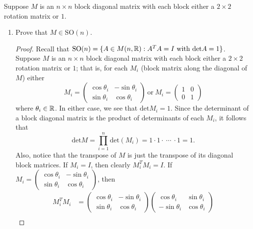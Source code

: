 \documentclass{article}
\begin{document}
\begin{problem}
    Suppose \( M  \) is an \( n \times n  \) block diagonal matrix with each block either a \( 2 \times 2  \) rotation matrix or \( 1  \).
\end{problem}
\begin{enumerate}
    \item[(11-1)]  Prove that \( M \in \text{SO}(n)   \).
    \begin{proof}
        Recall that \( \text{SO}(n) = \{ A \in M(n,\mathbb{R}) : A^{T} A = I \ \text{with} \ \text{det}A = 1  \}   \). Suppose \( M  \) is an \( n \times n  \) block diagonal matrix with each block either a \( 2 \times 2  \) rotation matrix or \( 1  \); that is, for each \( {M}_{i} \) (block matrix along the diagonal of \( M \)) either 
        \[ {M}_{i} = \begin{pmatrix} \cos {\theta}_{i} & - \sin {\theta}_{i} \\ \sin \theta_i & \cos \theta_i  \end{pmatrix} \ \text{or} \ {M}_{i} = \begin{pmatrix} 1 & 0 \\ 0 & 1  \end{pmatrix}  \tag{\( 1 \leq i \leq n \)} \]
        where \( {\theta}_{i} \in \mathbb{R}  \). In either case, we see that \( \text{det} {M}_{i} = 1  \). Since the determinant of a block diagonal matrix is the product of determinants of each \( {M}_{i} \), it follows that 
        \[  \text{det}M = \prod_{i=1}^{n} \text{det}({M}_{i})  = 1 \cdot 1 \cdot \ \cdots \ \cdot 1 = 1. \]
        Also, notice that the transpose of \( M  \) is just the transpose of its diagonal block matrices. If \( {M}_{i} = I  \), then clearly \({M}_{i}^{T} {M}_{i} = I \). If \( {M}_{i} = \displaystyle \begin{pmatrix} \cos {\theta}_{i} & - \sin \theta_i \\ \sin {\theta}_{i} & \cos {\theta}_{i} \end{pmatrix}  \), then
        \begin{align*}
            {M}_{i}^{T} {M}_{i} &= \begin{pmatrix} \cos {\theta}_{i} & - \sin {\theta}_{i} \\ \sin {\theta}_{i} & \cos {\theta}_{i} \end{pmatrix} \begin{pmatrix} \cos {\theta}_{i} & \sin {\theta}_{i} \\ - \sin \theta_i & \cos \theta_i \end{pmatrix}  \\

\end{align*}
\end{proof}
\end{enumerate}
\end{document}
